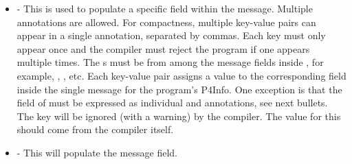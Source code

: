 \documentclass[11pt]{article}
\begin{document}
{\begin{itemize}
\item{}
 - This is used to populate a specific field within the 
message. Multiple  annotations are allowed. For compactness,
multiple key-value pairs can appear in a single  annotation,
separated by commas. Each key must only appear once and the compiler must
reject the program if one appears multiple times. The s must be from
among the message fields inside , for example, , ,
etc. Each key-value pair assigns a value to the corresponding field inside the
single  message for the program's P4Info. One exception is that the
 field of  must be expressed as individual
 and  annotations, see next bullets. The key  will
be ignored (with a warning) by the compiler. The value for this should come
from the compiler itself.%

\item{}
 - This will populate the  message field.%


\end{itemize}}
\end{document}
